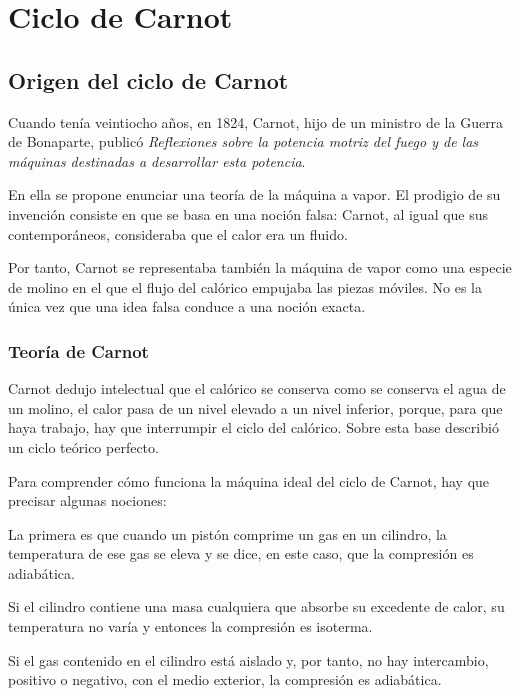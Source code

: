 \documentclass[../main]{subfiles}
\begin{document}
\chapter{Ciclo de Carnot}


\section{Origen del ciclo de Carnot}

Cuando tenía veintiocho años, en 1824, Carnot, hijo de un ministro de la Guerra de Bonaparte, publicó \emph{Reflexiones sobre la potencia motriz del fuego y de las máquinas destinadas a desarrollar esta potencia}.

En ella se propone enunciar una teoría de la máquina a vapor. El prodigio de su invención consiste en que se basa en una noción falsa: Carnot, al igual que sus contemporáneos, consideraba que el calor era un fluido.

Por tanto, Carnot se representaba también la máquina de vapor como una especie de molino en el que el flujo del calórico empujaba las piezas móviles. No es la única vez que una idea falsa conduce a una noción exacta.

\subsection{Teoría de Carnot}
Carnot dedujo  intelectual que el calórico se conserva como se conserva el agua de un molino, el calor pasa de un nivel elevado a un nivel inferior, porque, para que haya trabajo, hay que interrumpir el ciclo del calórico. Sobre esta base describió un ciclo teórico perfecto.

Para comprender cómo funciona la máquina ideal del ciclo de Carnot, hay que precisar algunas nociones:


La primera es que cuando un pistón comprime un gas en un cilindro, la temperatura de ese gas se eleva y se dice, en este caso, que la compresión es adiabática.

Si el cilindro contiene una masa cualquiera que absorbe su excedente de calor, su temperatura no varía y entonces la compresión es isoterma.

Si el gas contenido en el cilindro está aislado y, por tanto, no hay intercambio, positivo o negativo, con el medio exterior, la compresión es adiabática.
\end{document}
